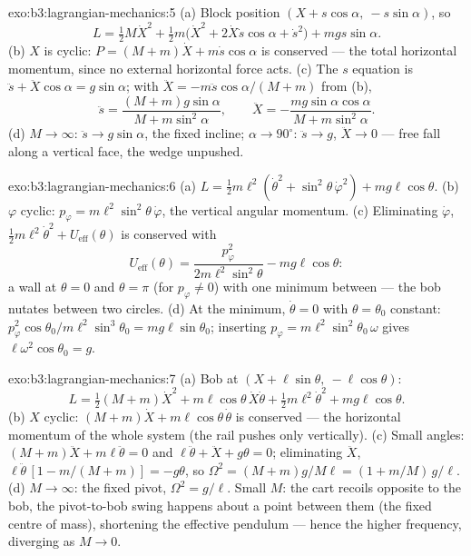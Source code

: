 \begin{solution}{exo:b3:lagrangian-mechanics:5}
(a) Block position $(X + s\cos\alpha,\ -s\sin\alpha)$, so
\[
L = \tfrac12 M\dot X^2 + \tfrac12 m\big(\dot X^2 +
2\dot X\dot s\cos\alpha + \dot s^2\big) + mgs\sin\alpha .
\]
(b) $X$ is cyclic: $P = (M + m)\dot X + m\dot s\cos\alpha$ is
conserved --- the total horizontal momentum, since no external
horizontal force acts. (c) The $s$ equation is $\ddot s + \ddot
X\cos\alpha = g\sin\alpha$; with $\ddot X = -m\ddot s\cos\alpha/(M +
m)$ from (b),
\[
\ddot s = \frac{(M + m)g\sin\alpha}{M + m\sin^2\alpha} , \qquad
\ddot X = -\frac{mg\sin\alpha\cos\alpha}{M + m\sin^2\alpha} .
\]
(d) $M \to \infty$: $\ddot s \to g\sin\alpha$, the fixed incline;
$\alpha \to 90^\circ$: $\ddot s \to g$, $\ddot X \to 0$ --- free fall
along a vertical face, the wedge unpushed.
\end{solution}

\begin{solution}{exo:b3:lagrangian-mechanics:6}
(a) $L = \tfrac12 m\ell^2(\dot\theta^2 + \sin^2\theta\,\dot\varphi^2) +
mg\ell\cos\theta$. (b) $\varphi$ cyclic: $p_\varphi =
m\ell^2\sin^2\theta\,\dot\varphi$, the vertical angular momentum. (c)
Eliminating $\dot\varphi$, $\tfrac12 m\ell^2\dot\theta^2 +
U_{\text{eff}}(\theta)$ is conserved with
\[
U_{\text{eff}}(\theta) = \frac{p_\varphi^2}{2m\ell^2\sin^2\theta}
 - mg\ell\cos\theta :
\]
a wall at $\theta = 0$ and $\theta = \pi$ (for $p_\varphi \neq 0$) with
one minimum between --- the bob nutates between two circles. (d) At the
minimum, $\dot\theta = 0$ with $\theta = \theta_0$ constant:
$p_\varphi^2\cos\theta_0/m\ell^2\sin^3\theta_0 = mg\ell\sin\theta_0$;
inserting $p_\varphi = m\ell^2\sin^2\theta_0\,\omega$ gives
$\ell\omega^2\cos\theta_0 = g$.
\end{solution}

\begin{solution}{exo:b3:lagrangian-mechanics:7}
(a) Bob at $(X + \ell\sin\theta,\ -\ell\cos\theta)$:
\[
L = \tfrac12(M + m)\dot X^2 + m\ell\cos\theta\,\dot X\dot\theta
 + \tfrac12 m\ell^2\dot\theta^2 + mg\ell\cos\theta .
\]
(b) $X$ cyclic: $(M + m)\dot X + m\ell\cos\theta\,\dot\theta$ is
conserved --- the horizontal momentum of the whole system (the rail
pushes only vertically). (c) Small angles: $(M + m)\ddot X +
m\ell\ddot\theta = 0$ and $\ell\ddot\theta + \ddot X + g\theta = 0$;
eliminating $\ddot X$, $\ell\ddot\theta\,[1 - m/(M + m)] = -g\theta$,
so $\Omega^2 = (M + m)g/M\ell = (1 + m/M)\,g/\ell$. (d) $M \to \infty$:
the fixed pivot, $\Omega^2 = g/\ell$. Small $M$: the cart recoils
opposite to the bob, the pivot-to-bob swing happens about a point
between them (the fixed centre of mass), shortening the effective
pendulum --- hence the higher frequency, diverging as $M \to 0$.
\end{solution}


